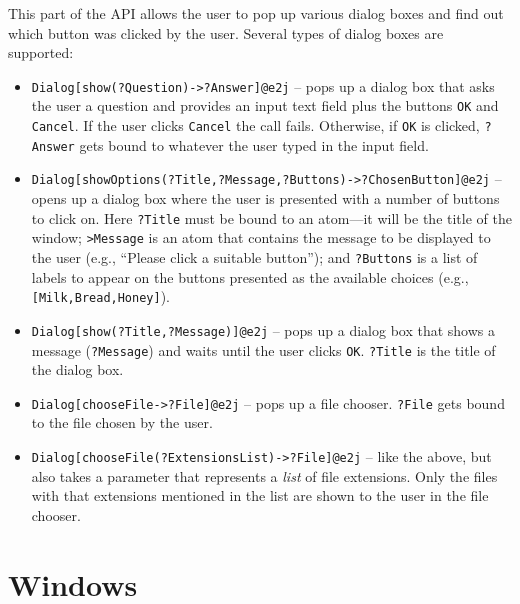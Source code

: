This part of the API allows the user to pop up various dialog boxes and
find out which button was clicked by the user. Several types of dialog
boxes are supported:
\begin{itemize}
\item \texttt{Dialog[show(?Question)->?Answer]@\bs{}e2j} -- pops up a dialog box
  that asks the user a question and provides
  an input text field plus the buttons \texttt{OK} and
  \texttt{Cancel}.   
  If the user clicks \texttt{Cancel} the call fails. Otherwise, if
  \texttt{OK} is clicked, \texttt{?Answer} gets bound to whatever the user
  typed in the input field.   
\item
  \texttt{Dialog[showOptions(?Title,?Message,?Buttons)->?ChosenButton]@\bs{}e2j} --
  opens up a dialog box where the user is presented with a number of
  buttons to click on. Here \texttt{?Title} must be bound to an atom---it
  will be the title of the window;  \texttt{>Message} is an atom that
  contains the message to be displayed to the user (e.g., ``Please click a
  suitable button''); and \texttt{?Buttons} is a list of labels to appear
  on the buttons presented as the available choices (e.g.,
  \texttt{[Milk,Bread,Honey]}).
\item \texttt{Dialog[show(?Title,?Message)]@\bs{}e2j} -- pops up a dialog box that 
  shows a message (\texttt{?Message}) and waits until the user clicks
  \texttt{OK}.  \texttt{?Title} is the title of the dialog box.
\item \texttt{Dialog[chooseFile->?File]@\bs{}e2j} -- pops up a file
  chooser. \texttt{?File} gets bound to the file chosen by the user.
\item \texttt{Dialog[chooseFile(?ExtensionsList)->?File]@\bs{}e2j} -- like the above, but
  also takes a parameter that represents a \emph{list} of  file
  extensions. Only the files
  with that extensions mentioned in the list are shown to the user in the
  file chooser.
\end{itemize}

\section{Windows}

